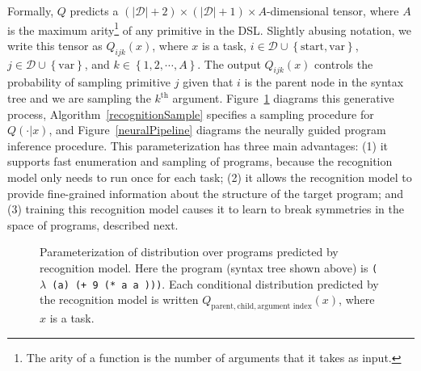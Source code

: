 \documentclass{article}
\begin{document}
Formally,
$Q$ predicts a $(|\mathcal{D}|+2)\times (|\mathcal{D}|+1)\times A$-dimensional tensor,
where $A$ is the maximum arity\footnote{The arity of a function is the number of arguments that it takes as input.} of any primitive in the DSL.
Slightly abusing notation, we write this tensor as $Q_{ijk}(x)$,
where $x$ is a task,
$i\in \mathcal{D}\cup\left\{\text{start},\text{var}\right\}$,
$j\in \mathcal{D}\cup\left\{\text{var} \right\}$,
and $k\in \left\{1,2,\cdots,A \right\}$.
The output $Q_{ijk}(x)$
controls the probability of
sampling primitive $j$ given that
$i$ is the parent node in the syntax tree
and we are sampling the $k^{\text{th}}$ argument.
Figure~\ref{bg} diagrams this generative process, Algorithm~\ref{recognitionSample}
specifies a sampling procedure for $Q(\cdot |x)$,
and Figure~\ref{neuralPipeline} diagrams the neurally guided program inference procedure.
This parameterization
has three main advantages:
(1) it supports fast enumeration
and sampling of programs,
because the
recognition model
only needs to run once for each task;
(2) it allows the recognition model to provide fine-grained
information about the structure of the target program;
and (3)
training this recognition model
causes it to learn to break symmetries in the space of programs,
described next.
\begin{figure}
\centering  {}
\caption{Parameterization of distribution over programs predicted by recognition model.
  Here the program (syntax tree shown above) is \texttt{($\lambda$ (a) (+ 9 (* a a )))}.
Each conditional distribution predicted by the recognition model is written $Q_{\text{parent},\text{child},\text{argument index}}(x)$, where $x$ is a task.}\label{bg}
\end{figure}
\end{document}
